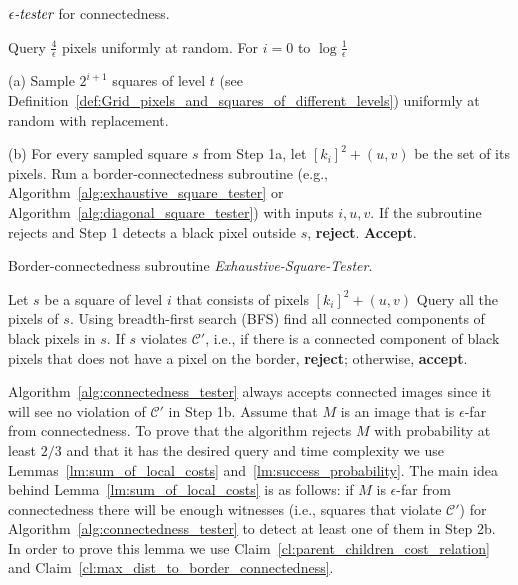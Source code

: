 \documentclass[11pt,english]{article}
\numberwithin{figure}{section}
\newcommand{\C}{{\mathcal C}}
\newcommand{\eps}{{\epsilon}}
\newcommand{\ste}{{\epsilon\emph{-tester}}}
\newcommand{\Accept}{\textbf{Accept}\xspace}
\newcommand{\accept}{\textbf{accept}\xspace}
\newcommand{\reject}{\textbf{reject}\xspace}
\newcommand{\lind}{t}
\begin{document}
\begin{algorithm}\label{alg:connectedness_tester}
\caption{$\ste$ for connectedness.}
\Input{parameter $\eps\in(0,1)$ ; access to a $n\times n$ binary
matrix $M$.}
\DontPrintSemicolon
\BlankLine
\nl
Query $\frac{4}{\eps}$ pixels uniformly at random.
\;
\nl For $i=0$ to  $\log\frac{1}{\eps}$

 (a) Sample $2^{i+1}$ squares of level $\lind$  (see Definition~\ref{def:Grid_pixels_and_squares_of_different_levels})
    uniformly at random with replacement.

 (b) For every sampled square $s$ from Step 1a, let
     $[k_{i}]^{2}+(u,v)$ be the set of its pixels.
Run a border-connectedness subroutine (e.g.,
Algorithm~\ref{alg:exhaustive_square_tester} or
Algorithm~\ref{alg:diagonal_square_tester}) with inputs $i,u,v$. If the
subroutine rejects and Step 1 detects a black pixel outside $s$, \reject.
\;
\nl
\Accept.
\;
\end{algorithm}
\begin{algorithm}\label{alg:exhaustive_square_tester}
\caption{Border-connectedness subroutine \emph{Exhaustive-Square-Tester}.}
\DontPrintSemicolon
\BlankLine
Let $s$ be a square of level $i$ that consists of pixels $[k_{i}]^{2}+(u,v)$
\;
\nl
 Query all the pixels of $s$.
 \;
\nl
Using breadth-first search (BFS) find all connected components of black pixels
in $s$.
 \;
\nl
 If $s$ violates $\C'$, i.e., if there is a connected component of black
 pixels that does not have a pixel on the border, \reject; otherwise,
 \accept.
 \;
\end{algorithm}
Algorithm~\ref{alg:connectedness_tester} always accepts connected images
since it will see no violation of $\C'$ in Step 1b. Assume that $M$ is an image that is $\eps$-far from connectedness. To prove that the
algorithm rejects $M$ with probability at least $2/3$ and that it has the
desired query and time complexity we use
Lemmas~\ref{lm:sum_of_local_costs} and~\ref{lm:success_probability}. The
main idea behind Lemma~\ref{lm:sum_of_local_costs} is as follows: if $M$ is
$\eps$-far from connectedness there will be enough witnesses (i.e., squares
that violate $\C'$) for Algorithm~\ref{alg:connectedness_tester} to
detect at least one of them in Step 2b. In order to prove this lemma we use Claim~\ref{cl:parent_children_cost_relation} and
Claim~\ref{cl:max_dist_to_border_connectedness}.
\end{document}
